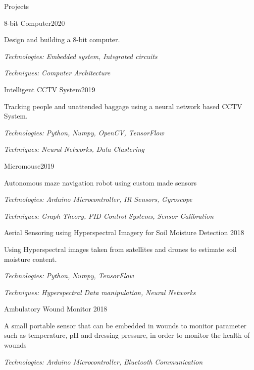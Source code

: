 \documentclass{resume} %
\begin{document}
\begin{rSection}{Projects}
\begin{rSubsection}{8-bit Computer}{2020}{}{}
\item Design and building a 8-bit computer. \item 
\textit{Technologies: Embedded system, Integrated circuits}
\item \textit{Techniques: Computer Architecture }
\end{rSubsection}

\begin{rSubsection}{Intelligent CCTV System}{2019}{}{}
\item Tracking people and unattended baggage using a neural network based CCTV System. \item 
\textit{Technologies: Python, Numpy, OpenCV, TensorFlow}
\item \textit{Techniques: Neural Networks, Data Clustering}
\end{rSubsection}


\begin{rSubsection}{Micromouse}{2019}{}{}
\item Autonomous maze navigation robot using custom made sensors 
\item \textit{Technologies: Arduino Microcontroller, IR Sensors, Gyroscope} 
\item \textit{Techniques: Graph Theory, PID Control Systems, Sensor Calibration}
\end{rSubsection}

\clearpage

\begin{rSubsection}{Aerial Sensoring using Hyperspectral Imagery for Soil Moisture Detection }{2018}{}{}
\item Using Hyperspectral images taken from satellites and drones to estimate soil moisture content. 
\item \textit{Technologies: Python, Numpy, TensorFlow}
\item \textit{Techniques: Hyperspectral Data manipulation, Neural Networks}
\end{rSubsection}


\begin{rSubsection}{Ambulatory Wound Monitor }{2018}{}{}
\item A small portable sensor that can be embedded in wounds to monitor parameter such as temperature, pH and dressing pressure, in order to monitor the health of wounds
\item \textit{Technologies: Arduino Microcontroller, Bluetooth Communication}
\end{rSubsection}


\end{rSection}
\end{document}
